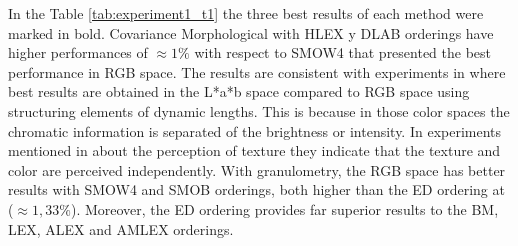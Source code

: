 \begin{table}
\begin{tabular}{@{}lrr@{}}
\end{tabular}
\label{exper_ordenaciones}
\end{table}
In the Table \ref{tab:experiment1_t1} the three best results of each method were marked in bold. Covariance Morphological with HLEX y DLAB orderings have higher performances of $\approx 1\%$ with respect to SMOW4 that presented the best performance in RGB space. The results are consistent with experiments in \cite{hanbury2005illumination} where best results are obtained in the L*a*b space compared to RGB space using structuring elements of dynamic lengths. This is because in those color spaces the chromatic information is separated of the brightness or intensity. 
In experiments mentioned in \cite{bianconi2011theoretical} about the perception of texture they indicate that the texture and color are perceived independently. 
With granulometry, the RGB space has better results with SMOW4 and SMOB orderings, both higher than the ED ordering at ($\approx 1,33 \% $). Moreover, the ED ordering provides far superior results to the BM, LEX, ALEX and AMLEX orderings.

